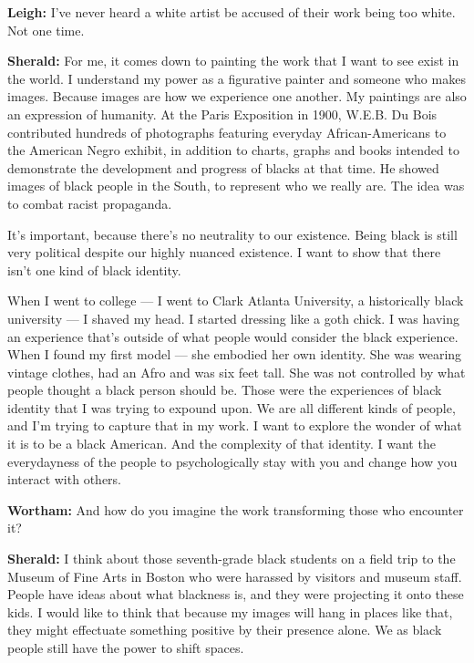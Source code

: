 \textbf{Leigh:} I've never heard a white artist be accused of their work
being too white. Not one time.

\textbf{Sherald:} For me, it comes down to painting the work that I want
to see exist in the world. I understand my power as a figurative painter
and someone who makes images. Because images are how we experience one
another. My paintings are also an expression of humanity. At the Paris
Exposition in 1900, W.E.B. Du Bois contributed hundreds of photographs
featuring everyday African-Americans to the American Negro exhibit, in
addition to charts, graphs and books intended to demonstrate the
development and progress of blacks at that time. He showed images of
black people in the South, to represent who we really are. The idea was
to combat racist propaganda.

It's important, because there's no neutrality to our existence. Being
black is still very political despite our highly nuanced existence. I
want to show that there isn't one kind of black identity.

When I went to college --- I went to Clark Atlanta University, a
historically black university --- I shaved my head. I started dressing
like a goth chick. I was having an experience that's outside of what
people would consider the black experience. When I found my first model
--- she embodied her own identity. She was wearing vintage clothes, had
an Afro and was six feet tall. She was not controlled by what people
thought a black person should be. Those were the experiences of black
identity that I was trying to expound upon. We are all different kinds
of people, and I'm trying to capture that in my work. I want to explore
the wonder of what it is to be a black American. And the complexity of
that identity. I want the everydayness of the people to psychologically
stay with you and change how you interact with others.

\textbf{Wortham:} And how do you imagine the work transforming those who
encounter it?

\textbf{Sherald:} I think about those seventh-grade black students on a
field trip to the Museum of Fine Arts in Boston who were harassed by
visitors and museum staff. People have ideas about what blackness is,
and they were projecting it onto these kids. I would like to think that
because my images will hang in places like that, they might effectuate
something positive by their presence alone. We as black people still
have the power to shift spaces.

